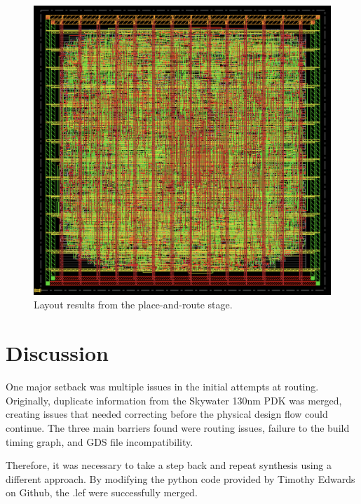 \documentclass[conference]{IEEEtran}
\begin{document}
\begin{figure}[htbp]
    \centering
    \includegraphics[width=\linewidth]{fig5.png} 
    \caption{Layout results from the place-and-route stage.}
    \label{fig5}
\end{figure}

\section{Discussion}
One major setback was multiple issues in the initial attempts at routing. Originally, duplicate information from the Skywater 130nm PDK was merged, creating issues that needed correcting before the physical design flow could continue. The three main barriers found were routing issues, failure to the build timing graph, and GDS file incompatibility.

Therefore, it was necessary to take a step back and repeat synthesis using a different approach. By modifying the python code provided by Timothy Edwards on Github, the .lef were successfully merged.\cite{b7}
\end{document}
